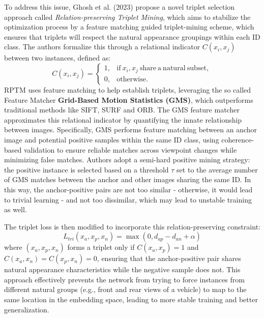 To address this issue, Ghosh et al. (2023) \cite{RPTMLoss} propose a novel triplet selection approach called \textit{Relation-preserving Triplet Mining}, which aims to stabilize the optimization process by a feature matching guided triplet-mining scheme, which ensures that triplets will respect the natural appearance groupings within each ID class. The authors formalize this through a relational indicator $C(x_i, x_j)$ between two instances, defined as:
\begin{equation}
    C(x_i, x_j) = \begin{cases}
    1, & \mathrm{if\ } x_i, x_j \mathrm{\ share\ a\ natural\ subset}, \\
    0, & \mathrm{otherwise}.
    \end{cases}
\end{equation}
RPTM uses feature matching to help establish triplets, leveraging the so called Feature Matcher \textbf{Grid-Based Motion Statistics (GMS)}, which outperforms traditional methods like SIFT, SURF and ORB.
The GMS feature matcher approximates this relational indicator by quantifying the innate relationship between images. Specifically, GMS performs feature matching between an anchor image and potential positive samples within the same ID class, using coherence-based validation to ensure reliable matches across viewpoint changes while minimizing false matches. Authors adopt a semi-hard positive mining strategy: the positive instance is selected based on a threshold $\tau$ set to the average number of GMS matches between the anchor and other images sharing the same ID. In this way, the anchor-positive pairs are not too similar - otherwise, it would lead to trivial learning - and not too dissimilar, which may lead to unstable training as well.

The triplet loss is then modified to incorporate this relation-preserving constraint:
\begin{equation}
L_{tri}(x_a, x_p, x_n) = \max(0, d_{ap} - d_{an} + \alpha)
\end{equation}
where $(x_a, x_p, x_n)$ forms a triplet only if $C(x_a, x_p) = 1$ and $C(x_a, x_n) = C(x_p, x_n) = 0$, ensuring that the anchor-positive pair shares natural appearance characteristics while the negative sample does not. This approach effectively prevents the network from trying to force instances from different natural groups (e.g., front and rear views of a vehicle) to map to the same location in the embedding space, leading to more stable training and better generalization.


